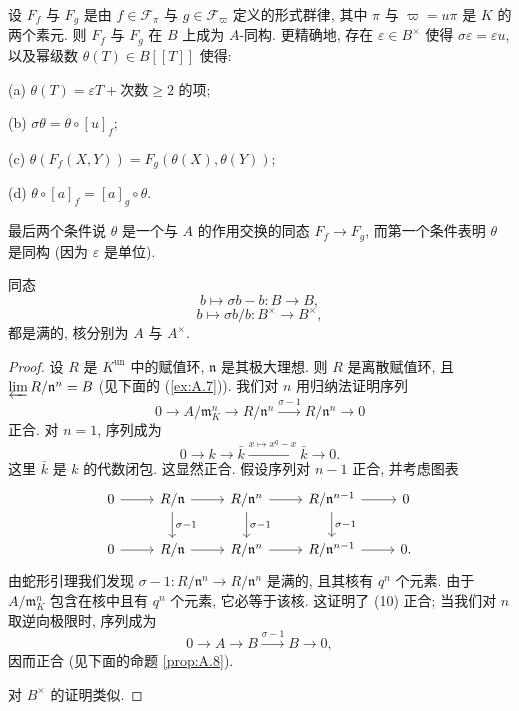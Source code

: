 \begin{proposition}\label{prop:3.10}
设 $F_f$ 与 $F_g$ 是由 $f\in\mathcal{F}_{\pi}$ 与 $g\in\mathcal{F}_{\varpi}$ 定义的形式群律, 其中 $\pi$ 与 $\varpi=u\pi$ 是 $K$ 的两个素元. 则 $F_f$ 与 $F_g$ 在 $B$ 上成为 $A$-同构. 更精确地, 存在 $\varepsilon\in B^{\times}$ 使得 $\sigma\varepsilon=\varepsilon u$, 以及幂级数 $\theta(T)\in B[[T]]$ 使得:

(a) $\theta(T)=\varepsilon T+\text{次数}\ge 2\text{ 的项}$;

(b) $\sigma\theta=\theta\circ[u]_f$;

(c) $\theta(F_f(X,Y))=F_g(\theta(X),\theta(Y))$;

(d) $\theta\circ[a]_f=[a]_g\circ\theta$.

最后两个条件说 $\theta$ 是一个与 $A$ 的作用交换的同态 $F_f\to F_g$, 而第一个条件表明 $\theta$ 是同构 (因为 $\varepsilon$ 是单位).
\end{proposition}

\begin{lemma}\label{lem:3.11}
同态
\[
b\mapsto\sigma b-b\colon B\to B,
\]
\[
b\mapsto\sigma b/b\colon B^{\times}\to B^{\times},
\]
都是满的, 核分别为 $A$ 与 $A^{\times}$.
\end{lemma}

\begin{proof}
设 $R$ 是 $K^{\mathrm{un}}$ 中的赋值环, $\mathfrak{n}$ 是其极大理想. 则 $R$ 是离散赋值环, 且 $\varprojlim R/\mathfrak{n}^n=B$ (见下面的 (\ref{ex:A.7})). 我们对 $n$ 用归纳法证明序列
\begin{equation*}
0\longrightarrow A/\mathfrak{m}_K^n\longrightarrow R/\mathfrak{n}^n\xrightarrow{\sigma-1}R/\mathfrak{n}^n\longrightarrow 0
\tag{10}
\end{equation*}
正合. 对 $n=1$, 序列成为
\[
0\xrightarrow{\quad}k\xrightarrow{\quad}\bar{k}\xrightarrow{x\mapsto x^q-x}\bar{k}\xrightarrow{\quad}0.
\]
这里 $\bar{k}$ 是 $k$ 的代数闭包. 这显然正合. 假设序列对 $n-1$ 正合, 并考虑图表
\[
\begin{tikzcd}
0\ar[r] & R/\mathfrak{n}\ar[r]\ar[d,"\sigma-1"] & R/\mathfrak{n}^n\ar[r]\ar[d,"\sigma-1"] & R/\mathfrak{n}^{n-1}\ar[r]\ar[d,"\sigma-1"] & 0\\
0\ar[r] & R/\mathfrak{n}\ar[r] & R/\mathfrak{n}^n\ar[r] & R/\mathfrak{n}^{n-1}\ar[r] & 0.
\end{tikzcd}
\]
由蛇形引理我们发现 $\sigma-1\colon R/\mathfrak{n}^n\to R/\mathfrak{n}^n$ 是满的, 且其核有 $q^n$ 个元素. 由于 $A/\mathfrak{m}_K^n$ 包含在核中且有 $q^n$ 个元素, 它必等于该核. 这证明了 (10) 正合; 当我们对 $n$ 取逆向极限时, 序列成为
\[
0\longrightarrow A\longrightarrow B\xrightarrow{\sigma-1}B\longrightarrow 0,
\]
因而正合 (见下面的命题 \ref{prop:A.8}).

对 $B^{\times}$ 的证明类似.
\end{proof}

